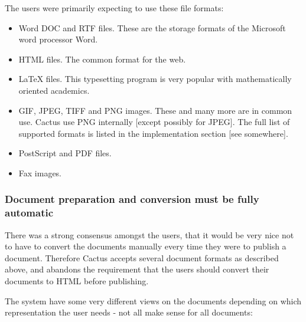 The users were primarily expecting to use these file formats:

\begin{itemize}
  
\item 
  Word DOC and RTF files.   These are the storage formats of the
  Microsoft word processor Word.  
\item 
  HTML files.  The common format for the web.
\item 
  LaTeX files.   This typesetting program is very popular with
  mathematically oriented academics.
\item 
  GIF, JPEG, TIFF and PNG images.   These and many more are in common use.  Cactus use PNG internally [except possibly for JPEG].  The full list of supported
formats is listed in the implementation section [see somewhere].
\item 
  PostScript and PDF files.
\item 
  Fax images.
\end{itemize}

\subsubsection{Document preparation and conversion must be fully automatic}

There was a strong consensus amongst the users, that it would be very
nice not to have to convert the documents manually every time they
were to publish a document.  Therefore Cactus accepts several document
formats as described above, and abandons the requirement that the
users should convert their documents to HTML before publishing.

The system have some very different views on the documents depending
on which representation the user needs - not all make sense for all
documents:

